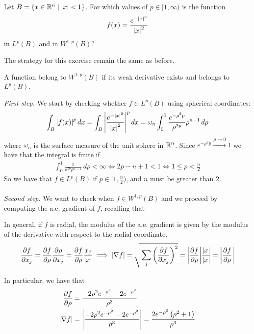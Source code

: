 \newpage
\begin{exercise}
    Let \(B = \left\{ x \in \mathbb{R}^n \mid \abs{x} < 1 \right\}\). For which values of \(p \in [1, \infty) \) is the function
    \[
        f(x) = \frac{e^{-\abs{x}^2}}{\abs{x}^2}
    \]
    in \(L^p(B)\) and in \(W^{1, p}(B)\)?
\end{exercise}
The strategy for this exercise remain the same as before.
\begin{remark}
    A function belong to \(W^{1, p}(B)\) if its weak derivative exists and belongs to \(L^p(B)\).
\end{remark}
\textit{First step.} We start by checking whether $f \in L^p(B)$ using spherical coordinates:
\[
    \int_B \abs{f(x)}^p \, dx = \int_B \abs{\frac{e^{-\abs{x}^2}}{\abs{x}^2}}^p \, dx = \omega_n \int_0^1 \frac{e^{-\rho^2 p}}{\rho^{2p}} \rho^{n-1} \, d\rho
\]
where \(\omega_n\) is the surface measure of the unit sphere in \(\mathbb{R}^n\).
Since \(e^{-\rho^2 p} \overset{\rho \to 0}{\longrightarrow} 1\) we have that
the integral is finite if
\[
    \begin{split}
        \int_0^1 \frac{1}{\rho^{2p} \rho^{n-1}} \, d\rho < \infty \iff 2p - n + 1 < 1 \iff 1 \leq p < \frac{n}{2}
    \end{split}
\]
So we have that $f \in L^p(B)$ if $p \in [1, \frac{n}{2})$, and $n$ must be
greater than 2. \\ \vspace{0.1cm}\\ \textit{Second step.} We want to check when
\(f \in W^{1, p}(B)\) and we proceed by computing the a.e. gradient of \(f\),
recalling that
\begin{remark}
    In general, if \(f\) is radial, the modulus of the a.e. gradient is given by the modulus of the derivative with respect to the radial coordinate.
    \begin{equation*}
        \frac{\partial f}{\partial x_j} = \frac{\partial f}{\partial \rho} \frac{\partial \rho}{\partial x_j} = \frac{\partial f}{\partial \rho} \frac{x_j}{\abs{x}}
        \implies \abs{\nabla f} = \sqrt{\sum_j \left(\frac{\partial f}{\partial x_j}\right)^2} = \abs{\frac{\partial f}{\partial \rho}} \frac{\abs{x}}{\abs{x}} = \abs{\frac{\partial f}{\partial \rho}}
    \end{equation*}
\end{remark}
In particular, we have that
\begin{align*}
    \frac{\partial f}{\partial \rho} & = \frac{-2 \rho^2 e^{-\rho^2} - 2 e^{-\rho^2}}{\rho^3}                                                              \\
    \abs{\nabla f}                    & = \abs{\frac{-2 \rho^2 e^{-\rho^2} - 2 e^{-\rho^2}}{\rho^3}} = \frac{2 e^{-\rho^2} \left(\rho^2 + 1\right)}{\rho^3}
\end{align*}
